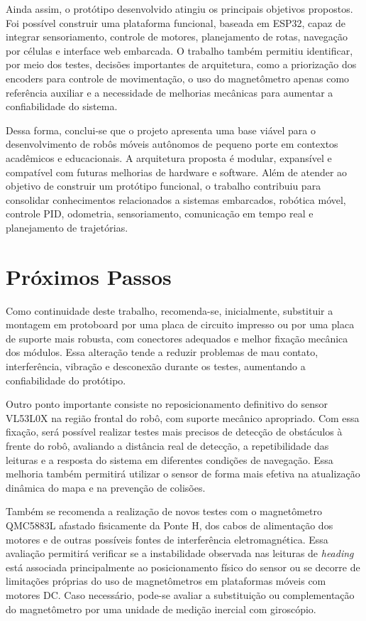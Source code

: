 \documentclass[	12pt, Times, openright, twoside, a4paper, english, brazil]{abntex2}
\begin{document}
Ainda assim, o protótipo desenvolvido atingiu os principais objetivos propostos. Foi possível construir uma plataforma funcional, baseada em ESP32, capaz de integrar sensoriamento, controle de motores, planejamento de rotas, navegação por células e interface web embarcada. O trabalho também permitiu identificar, por meio dos testes, decisões importantes de arquitetura, como a priorização dos encoders para controle de movimentação, o uso do magnetômetro apenas como referência auxiliar e a necessidade de melhorias mecânicas para aumentar a confiabilidade do sistema.

Dessa forma, conclui-se que o projeto apresenta uma base viável para o desenvolvimento de robôs móveis autônomos de pequeno porte em contextos acadêmicos e educacionais. A arquitetura proposta é modular, expansível e compatível com futuras melhorias de hardware e software. Além de atender ao objetivo de construir um protótipo funcional, o trabalho contribuiu para consolidar conhecimentos relacionados a sistemas embarcados, robótica móvel, controle PID, odometria, sensoriamento, comunicação em tempo real e planejamento de trajetórias.

\section{Próximos Passos}

Como continuidade deste trabalho, recomenda-se, inicialmente, substituir a montagem em protoboard por uma placa de circuito impresso ou por uma placa de suporte mais robusta, com conectores adequados e melhor fixação mecânica dos módulos. Essa alteração tende a reduzir problemas de mau contato, interferência, vibração e desconexão durante os testes, aumentando a confiabilidade do protótipo.

Outro ponto importante consiste no reposicionamento definitivo do sensor VL53L0X na região frontal do robô, com suporte mecânico apropriado. Com essa fixação, será possível realizar testes mais precisos de detecção de obstáculos à frente do robô, avaliando a distância real de detecção, a repetibilidade das leituras e a resposta do sistema em diferentes condições de navegação. Essa melhoria também permitirá utilizar o sensor de forma mais efetiva na atualização dinâmica do mapa e na prevenção de colisões.

Também se recomenda a realização de novos testes com o magnetômetro QMC5883L afastado fisicamente da Ponte H, dos cabos de alimentação dos motores e de outras possíveis fontes de interferência eletromagnética. Essa avaliação permitirá verificar se a instabilidade observada nas leituras de \textit{heading} está associada principalmente ao posicionamento físico do sensor ou se decorre de limitações próprias do uso de magnetômetros em plataformas móveis com motores DC. Caso necessário, pode-se avaliar a substituição ou complementação do magnetômetro por uma unidade de medição inercial com giroscópio.
\end{document}
